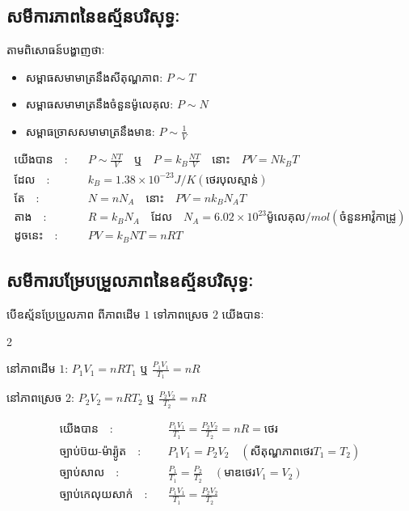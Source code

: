 	 \subsection{សមីការភាពនៃឧស្ម័នបរិសុទ្ធៈ} តាមពិសោធន៍បង្ហាញថាៈ
		\begin{itemize}
			\item សម្ពាធសមាមាត្រនឹងសីតុណ្ហភាព\quad : \quad $P\sim T$
			\item សម្ពាធសមាមាត្រនឹងចំនួនម៉ូលេគុល\quad : \quad $P\sim N$
			\item សម្ពាធច្រាសសមាមាត្រនឹងមាឌ\quad : \quad $P\sim\frac{1}{V}$
		\end{itemize}
		\begin{align*}
			\text{យើងបាន}\quad :& \quad P\sim \frac{NT}{V}\quad \text{ឬ}\quad P=k_{B}\frac{NT}{V}\quad \text{នោះ}\quad PV=Nk_{B}T\\\text{ដែល}\quad :&\quad k_{B}=1.38\times10^{-23}J/K\left(\text{ថេរបុលស្មាន់}\right)\\
			\text{តែ}\quad :&\quad N=nN_{A}\quad \text{នោះ}\quad PV=nk_{B}N_{A}T\\
			\text{តាង}\quad :&\quad R=k_{B}N_{A}\quad\text{ដែល}\quad N_{A}=6.02\times10^{23}\text{ម៉ូលេគុល}/mol\left(\text{ចំនួនអាវ៉ូកាដ្រូ}\right)\\
			\text{ដូចនេះ}\quad :&\quad PV=k_{B}NT=nRT
		\end{align*}
		\subsection{សមីការបម្រែបម្រួលភាពនៃឧស្ម័នបរិសុទ្ធៈ} បើឧស្ម័នប្រែប្រួលភាព ពីភាពដើម $1$ ទៅភាពស្រេច $2$ យើងបានៈ
		\begin{itemize}
		\end{itemize}
		\begin{align*}
		\text{យើងបាន}\quad :&\quad \frac{P_1V_1}{T_1}=\frac{P_2V_2}{T_2}=nR=\text{ថេរ}\\
		\text{ច្បាប់ប៊យ-ម៉ារ្យ៉ូត}\quad :&\quad P_{1}V_{1}=P_{2}V_{2}\quad \left(\text{សីតុណ្ហភាពថេរ} T_{1}=T_{2}\right)\\
		\text{ច្បាប់សាល}\quad :&\quad \frac{P_1}{T_1}=\frac{P_2}{T_2}\quad \left(\text{មាឌថេរ} V_{1}=V_{2}\right)\\
		\text{ច្បាប់កេលុយសាក់}\quad :&\quad \frac{P_1V_1}{T_1}=\frac{P_2V_2}{T_2}\\
		\end{align*}
